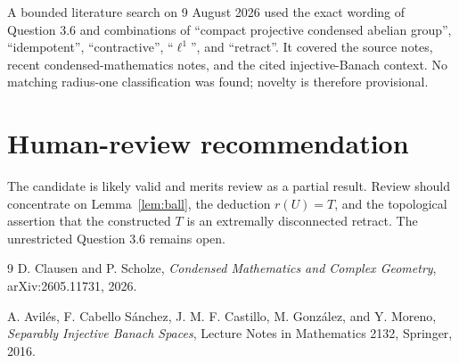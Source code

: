 \documentclass[11pt]{article}
\begin{document}
A bounded literature search on 9 August 2026 used the exact wording of
Question 3.6 and combinations of ``compact projective condensed abelian
group'', ``idempotent'', ``contractive'', ``$\ell^1$'', and ``retract''.
It covered the source notes, recent condensed-mathematics notes, and the cited
injective-Banach context.  No matching radius-one classification was found;
novelty is therefore provisional.

\section{Human-review recommendation}

The candidate is likely valid and merits review as a partial result.  Review
should concentrate on Lemma~\ref{lem:ball}, the deduction $r(U)=T$, and the
topological assertion that the constructed $T$ is an extremally disconnected
retract.  The unrestricted Question 3.6 remains open.

\begin{thebibliography}{9}
D. Clausen and P. Scholze,
\emph{Condensed Mathematics and Complex Geometry},
arXiv:2605.11731, 2026.

A. Avil\'es, F. Cabello S\'anchez, J. M. F. Castillo, M. Gonz\'alez, and
Y. Moreno,
\emph{Separably Injective Banach Spaces},
Lecture Notes in Mathematics 2132, Springer, 2016.
\end{thebibliography}
\end{document}
